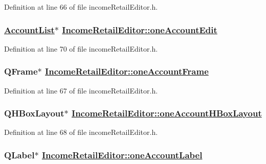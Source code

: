 Definition at line 66 of file income\-Retail\-Editor.h.\hypertarget{classIncomeRetailEditor_r13}{
\subsubsection[oneAccountEdit]{\setlength{\rightskip}{0pt plus 5cm}\hyperlink{classAccountList}{Account\-List}$\ast$ \hyperlink{classIncomeRetailEditor_r13}{Income\-Retail\-Editor::one\-Account\-Edit}}}
\label{classIncomeRetailEditor_r13}


Definition at line 70 of file income\-Retail\-Editor.h.\hypertarget{classIncomeRetailEditor_r10}{
\subsubsection[oneAccountFrame]{\setlength{\rightskip}{0pt plus 5cm}QFrame$\ast$ \hyperlink{classIncomeRetailEditor_r10}{Income\-Retail\-Editor::one\-Account\-Frame}}}
\label{classIncomeRetailEditor_r10}


Definition at line 67 of file income\-Retail\-Editor.h.\hypertarget{classIncomeRetailEditor_r11}{
\subsubsection[oneAccountHBoxLayout]{\setlength{\rightskip}{0pt plus 5cm}QHBox\-Layout$\ast$ \hyperlink{classIncomeRetailEditor_r11}{Income\-Retail\-Editor::one\-Account\-HBox\-Layout}}}
\label{classIncomeRetailEditor_r11}


Definition at line 68 of file income\-Retail\-Editor.h.\hypertarget{classIncomeRetailEditor_r12}{
\subsubsection[oneAccountLabel]{\setlength{\rightskip}{0pt plus 5cm}QLabel$\ast$ \hyperlink{classIncomeRetailEditor_r12}{Income\-Retail\-Editor::one\-Account\-Label}}}
\label{classIncomeRetailEditor_r12}



